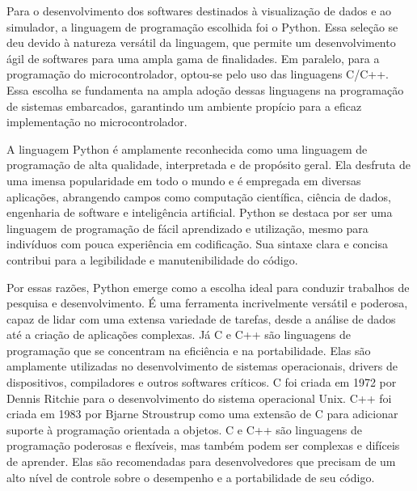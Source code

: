 Para o desenvolvimento dos softwares destinados à visualização de dados e ao simulador, a linguagem de programação escolhida foi o Python. Essa seleção se deu devido à natureza versátil da linguagem, que permite um desenvolvimento ágil de softwares para uma ampla gama de finalidades. Em paralelo, para a programação do microcontrolador, optou-se pelo uso das linguagens C/C++. Essa escolha se fundamenta na ampla adoção dessas linguagens na programação de sistemas embarcados, garantindo um ambiente propício para a eficaz implementação no microcontrolador.

A linguagem Python é amplamente reconhecida como uma linguagem de programação de alta qualidade, interpretada e de propósito geral. Ela desfruta de uma imensa popularidade em todo o mundo e é empregada em diversas aplicações, abrangendo campos como computação científica, ciência de dados, engenharia de software e inteligência artificial. Python se destaca por ser uma linguagem de programação de fácil aprendizado e utilização, mesmo para indivíduos com pouca experiência em codificação. Sua sintaxe clara e concisa contribui para a legibilidade e manutenibilidade do código.

Por essas razões, Python emerge como a escolha ideal para conduzir trabalhos de pesquisa e desenvolvimento. É uma ferramenta incrivelmente versátil e poderosa, capaz de lidar com uma extensa variedade de tarefas, desde a análise de dados até a criação de aplicações complexas. Já C e C++ são linguagens de programação que se concentram na eficiência e na portabilidade. Elas são amplamente utilizadas no desenvolvimento de sistemas operacionais, drivers de dispositivos, compiladores e outros softwares críticos. C foi criada em 1972 por Dennis Ritchie para o desenvolvimento do sistema operacional Unix. C++ foi criada em 1983 por Bjarne Stroustrup como uma extensão de C para adicionar suporte à programação orientada a objetos. C e C++ são linguagens de programação poderosas e flexíveis, mas também podem ser complexas e difíceis de aprender. Elas são recomendadas para desenvolvedores que precisam de um alto nível de controle sobre o desempenho e a portabilidade de seu código.